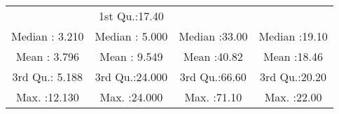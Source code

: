 \documentclass[
]{article}
\begin{document}
\begin{longtable}[]{@{}cccc@{}}
\begin{minipage}[t]{0.20\columnwidth}
\end{minipage} & \begin{minipage}[t]{0.22\columnwidth}\centering
1st Qu.:17.40\strut
\end{minipage}\tabularnewline
\begin{minipage}[t]{0.21\columnwidth}\centering
Median : 3.210\strut
\end{minipage} & \begin{minipage}[t]{0.21\columnwidth}\centering
Median : 5.000\strut
\end{minipage} & \begin{minipage}[t]{0.20\columnwidth}\centering
Median :33.00\strut
\end{minipage} & \begin{minipage}[t]{0.22\columnwidth}\centering
Median :19.10\strut
\end{minipage}\tabularnewline
\begin{minipage}[t]{0.21\columnwidth}\centering
Mean : 3.796\strut
\end{minipage} & \begin{minipage}[t]{0.21\columnwidth}\centering
Mean : 9.549\strut
\end{minipage} & \begin{minipage}[t]{0.20\columnwidth}\centering
Mean :40.82\strut
\end{minipage} & \begin{minipage}[t]{0.22\columnwidth}\centering
Mean :18.46\strut
\end{minipage}\tabularnewline
\begin{minipage}[t]{0.21\columnwidth}\centering
3rd Qu.: 5.188\strut
\end{minipage} & \begin{minipage}[t]{0.21\columnwidth}\centering
3rd Qu.:24.000\strut
\end{minipage} & \begin{minipage}[t]{0.20\columnwidth}\centering
3rd Qu.:66.60\strut
\end{minipage} & \begin{minipage}[t]{0.22\columnwidth}\centering
3rd Qu.:20.20\strut
\end{minipage}\tabularnewline
\begin{minipage}[t]{0.21\columnwidth}\centering
Max. :12.130\strut
\end{minipage} & \begin{minipage}[t]{0.21\columnwidth}\centering
Max. :24.000\strut
\end{minipage} & \begin{minipage}[t]{0.20\columnwidth}\centering
Max. :71.10\strut
\end{minipage} & \begin{minipage}[t]{0.22\columnwidth}\centering
Max. :22.00\strut
\end{minipage}\tabularnewline
\bottomrule
\end{longtable}
\end{document}
